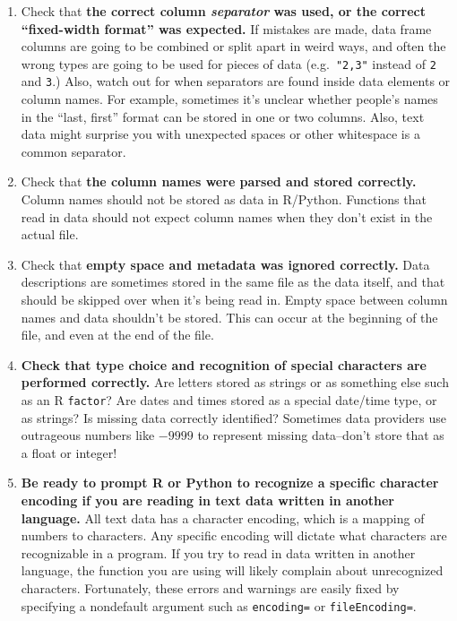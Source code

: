 \documentclass[12pt,krantz2]{krantz}
\providecommand{\tightlist}{%
  \setlength{\itemsep}{0pt}\setlength{\parskip}{0pt}}
\begin{document}
\begin{enumerate}
\def\labelenumi{\arabic{enumi}.}
\tightlist
\item
  Check that \textbf{the correct column \emph{separator} was used, or the correct ``fixed-width format'' was expected.} If mistakes are made, data frame columns are going to be combined or split apart in weird ways, and often the wrong types are going to be used for pieces of data (e.g.~\texttt{"2,3"} instead of \texttt{2} and \texttt{3}.) Also, watch out for when separators are found inside data elements or column names. For example, sometimes it's unclear whether people's names in the ``last, first'' format can be stored in one or two columns. Also, text data might surprise you with unexpected spaces or other whitespace is a common separator.
\item
  Check that \textbf{the column names were parsed and stored correctly.} Column names should not be stored as data in R/Python. Functions that read in data should not expect column names when they don't exist in the actual file.
\item
  Check that \textbf{empty space and metadata was ignored correctly.} Data descriptions are sometimes stored in the same file as the data itself, and that should be skipped over when it's being read in. Empty space between column names and data shouldn't be stored. This can occur at the beginning of the file, and even at the end of the file.
\item
  \textbf{Check that type choice and recognition of special characters are performed correctly.} Are letters stored as strings or as something else such as an R \texttt{factor}? Are dates and times stored as a special date/time type, or as strings? Is missing data correctly identified? Sometimes data providers use outrageous numbers like \(-9999\) to represent missing data--don't store that as a float or integer!
\item
  \textbf{Be ready to prompt R or Python to recognize a specific character encoding if you are reading in text data written in another language.} All text data has a character encoding, which is a mapping of numbers to characters. Any specific encoding will dictate what characters are recognizable in a program. If you try to read in data written in another language, the function you are using will likely complain about unrecognized characters. Fortunately, these errors and warnings are easily fixed by specifying a nondefault argument such as \texttt{encoding=} or \texttt{fileEncoding=}.
\end{enumerate}
\end{document}
